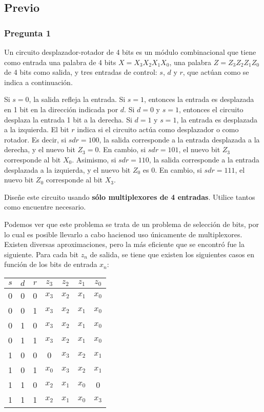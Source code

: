 \documentclass[../procedimientos.tex]{subfiles}
\begin{document}
\subsection{Previo} \label{subs:previo}
\subsubsection*{Pregunta 1}
\begin{em}
  Un circuito desplazador-rotador de 4 bits es un módulo combinacional que 
  tiene como entrada una palabra de 4 bits $X=X_3X_2X_1X_0$, una palabra 
  $Z=Z_3Z_2Z_1Z_0$ de 4 bits como salida, y tres entradas de control: $s$, $d$  
  y $r$, que actúan como se indica a continuación.

  Si $s=0$, la salida refleja la entrada. Si $s=1$, entonces la entrada es 
  desplazada en 1 bit en la dirección indicada por $d$. Si $d=0$ y $s=1$, 
  entonces el circuito desplaza la entrada 1 bit a la derecha.  Si $d=1$ y 
  $s=1$, la entrada es desplazada a la izquierda. El bit $r$ indica si el 
  circuito actúa como desplazador o como rotador. Es decir, si $sdr=100$, la 
  salida corresponde a la entrada desplazada a la derecha, y el nuevo bit 
  $Z_3=0$. En cambio, si $sdr=101$, el nuevo bit $Z_3$ corresponde al bit 
  $X_0$.  Asimismo, si $sdr=110$, la salida corresponde a la entrada 
  desplazada a la izquierda, y el nuevo bit $Z_0$ es $0$. En cambio, si 
  $sdr=111$, el nuevo bit $Z_0$ corresponde al bit $X_3$.

  Diseñe este circuito usando \textbf{sólo multiplexores de 4 entradas}.  
  Utilice tantos como encuentre necesario.
\end{em}

Podemos ver que este problema se trata de un problema de selección de bits, 
por lo cual es posible llevarlo a cabo hacienod uso únicamente de 
multiplexores. Existen diversas aproximaciones, pero la más eficiente que se 
encontró fue la siguiente. Para cada bit $z_n$ de salida, se tiene que existen 
los siguientes casos en función de los bits de entrada $x_n$:
\begin{table}[H]
  \centering
  \begin{tabular}{ccc|cccc}
    $s$ & $d$ & $r$ & $z_3$ & $z_2$ & $z_1$ & $z_0$\\
    \hline
    0 & 0 & 0 & $x_3$ & $x_2$ & $x_1$ & $x_0$\\
    0 & 0 & 1 & $x_3$ & $x_2$ & $x_1$ & $x_0$\\
    0 & 1 & 0 & $x_3$ & $x_2$ & $x_1$ & $x_0$\\
    0 & 1 & 1 & $x_3$ & $x_2$ & $x_1$ & $x_0$\\
    1 & 0 & 0 & 0     & $x_3$ & $x_2$ & $x_1$\\
    1 & 0 & 1 & $x_0$ & $x_3$ & $x_2$ & $x_1$\\
    1 & 1 & 0 & $x_2$ & $x_1$ & $x_0$ & 0    \\
    1 & 1 & 1 & $x_2$ & $x_1$ & $x_0$ & $x_3$
  \end{tabular}
\end{table}
\end{document}
